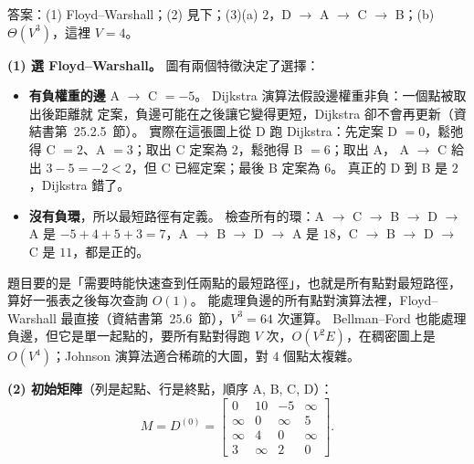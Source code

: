 \begin{pastsoln}
答案：(1) Floyd--Warshall；(2) 見下；(3)(a) $2$，D $\to$ A $\to$ C $\to$ B；(b) $\Theta(V^3)$，這裡
$V = 4$。

\textbf{(1) 選 Floyd--Warshall。} 圖有兩個特徵決定了選擇：
\begin{itemize}
\item \textbf{有負權重的邊} A $\to$ C $= -5$。 Dijkstra 演算法假設邊權重非負：一個點被取出後距離就
定案，負邊可能在之後讓它變得更短，Dijkstra 卻不會再更新（資結書第~25.2.5~節）。 實際在這張圖上從 D
跑 Dijkstra：先定案 D $= 0$，鬆弛得 C $= 2$、A $= 3$；取出 C 定案為 $2$，鬆弛得 B $= 6$；取出 A，
A $\to$ C 給出 $3 - 5 = -2 < 2$，但 C 已經定案；最後 B 定案為 $6$。 真正的 D 到 B 是 $2$，Dijkstra 錯了。
\item \textbf{沒有負環}，所以最短路徑有定義。 檢查所有的環：A $\to$ C $\to$ B $\to$ D $\to$ A 是
$-5 + 4 + 5 + 3 = 7$，A $\to$ B $\to$ D $\to$ A 是 $18$，C $\to$ B $\to$ D $\to$ C 是 $11$，都是正的。
\end{itemize}
題目要的是「需要時能快速查到任兩點的最短路徑」，也就是所有點對最短路徑，算好一張表之後每次查詢
$O(1)$。 能處理負邊的所有點對演算法裡，Floyd--Warshall 最直接（資結書第~25.6~節），$V^3 = 64$ 次運算。
Bellman--Ford 也能處理負邊，但它是單一起點的，要所有點對得跑 $V$ 次，$O(V^2 E)$，在稠密圖上是
$O(V^4)$；Johnson 演算法適合稀疏的大圖，對 $4$ 個點太複雜。

\textbf{(2) 初始矩陣}（列是起點、行是終點，順序 A, B, C, D）：
\[
M = D^{(0)} =
\begin{bmatrix}
0 & 10 & -5 & \infty \\
\infty & 0 & \infty & 5 \\
\infty & 4 & 0 & \infty \\
3 & \infty & 2 & 0
\end{bmatrix}.
\]


\end{pastsoln}
